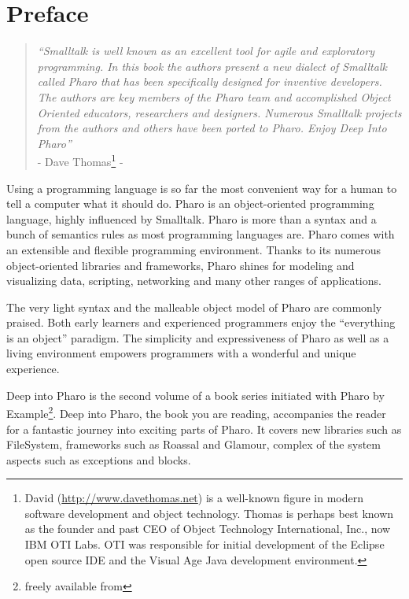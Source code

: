 \documentclass[a4paper,10pt,twoside]{book}
\begin{document}
	\sloppy
	\frontmatter
\fi
\chapter{Preface}

\indent

 \begin{quote}
   \emph{``Smalltalk is well known as an excellent tool for agile and exploratory programming.  In this book the authors present a new dialect of Smalltalk called Pharo that has been specifically designed for inventive developers.  The authors are key members of the Pharo team and accomplished Object Oriented educators, researchers and designers.   Numerous Smalltalk projects from the authors and others have been ported to Pharo.  Enjoy Deep Into Pharo''} \\ - Dave Thomas\footnote{David (\url{http://www.davethomas.net}) is a well-known figure in modern software development and object technology. Thomas is perhaps best known as the founder and past CEO of Object Technology International, Inc., now IBM OTI Labs. OTI was responsible for initial development of the Eclipse open source IDE and the Visual Age Java development environment.} -   
\end{quote}

Using a programming language is so far the most convenient way for a human to tell  a computer what it should do. Pharo is an object-oriented programming language, highly influenced by Smalltalk. Pharo is more than a syntax and a bunch of semantics rules as most programming languages are. Pharo comes with an extensible and flexible programming environment. Thanks to its numerous object-oriented libraries and frameworks, Pharo shines for modeling and visualizing data, scripting, networking and many other ranges of applications.

The very light syntax and the malleable object model of Pharo are commonly praised. Both early learners and experienced programmers enjoy the ``everything is an object'' paradigm. The simplicity and expressiveness of Pharo as well as a living environment empowers programmers with a wonderful and unique experience. 

Deep into Pharo is the second volume of a book series initiated with Pharo by Example\footnote{freely available from }. 
Deep into Pharo, the book you are reading, accompanies the reader for a fantastic journey into exciting parts of Pharo. It covers new libraries such as FileSystem, frameworks such as Roassal and Glamour, complex of the system aspects such as exceptions and blocks. 
\end{document}
